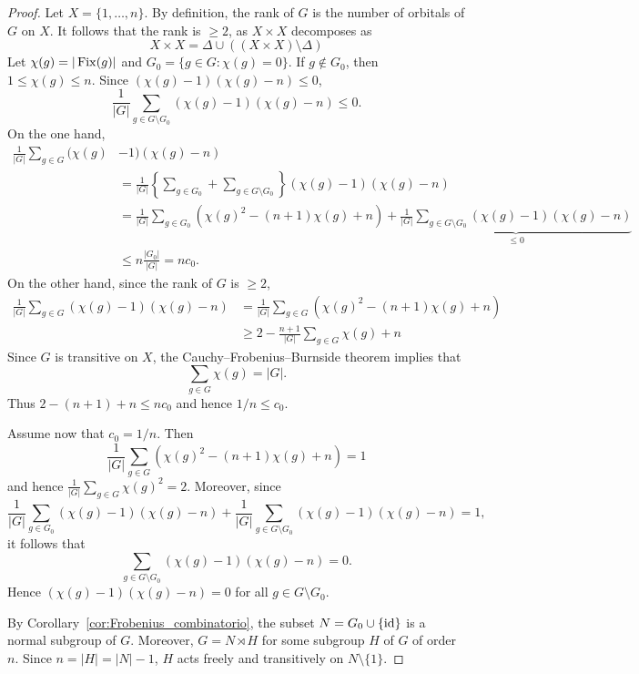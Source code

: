 \begin{proof}
    Let $X=\{1,\dots,n\}$. By definition, the rank of $G$ is the number
    of orbitals of $G$ on $X$. It follows that the rank is $\geq2$, as
    $X\times X$ decomposes as 
    \[
    X\times X=\Delta\cup\left((X\times X)\setminus\Delta\right)
    \]
    Let $\chi(g)=|\operatorname{Fix}(g)|$ and $G_0=\{g\in G:\chi(g)=0\}$. If $g\not\in G_0$, then $1\leq\chi(g)\leq n$. Since  
    $(\chi(g)-1)(\chi(g)-n)\leq 0$,
    \[
    \frac{1}{|G|}\sum_{g\in G\setminus G_0}(\chi(g)-1)(\chi(g)-n)\leq 0.
    \]
    On the one hand, 
    \begin{align*}
    \frac{1}{|G|}\sum_{g\in G}(\chi(g)&-1)(\chi(g)-n)\\
    &=\frac{1}{|G|}\left\{\sum_{g\in G_0}+\sum_{g\in G\setminus G_0}\right\}(\chi(g)-1)(\chi(g)-n)\\
    &=\frac{1}{|G|}\sum_{g\in G_0}(\chi(g)^2-(n+1)\chi(g)+n)
    +\underbrace{\frac{1}{|G|}\sum_{g\in G\setminus G_0}(\chi(g)-1)(\chi(g)-n)}_{\leq0}\\
    &\leq n\frac{|G_0|}{|G|}=nc_0.
    \end{align*}
    On the other hand, since the rank of $G$ is $\geq2$, 
    \begin{align*}
        \frac{1}{|G|}\sum_{g\in G}(\chi(g)-1)(\chi(g)-n)
        &=\frac{1}{|G|}\sum_{g\in G}(\chi(g)^2-(n+1)\chi(g)+n)\\
        &\geq 2-\frac{n+1}{|G|}\sum_{g\in G}\chi(g)+n
    \end{align*}
    Since $G$ is transitive on $X$, the Cauchy--Frobenius--Burnside theorem implies that
    \[
    \sum_{g\in G}\chi(g)=|G|.
    \]
    Thus $2-(n+1)+n\leq nc_0$ and hence
    $1/n\leq c_0$. 

    Assume now that 
    $c_0=1/n$. Then
    \[
    \frac{1}{|G|}\sum_{g\in G}(\chi(g)^2-(n+1)\chi(g)+n)=1
    \]
    and hence $\frac{1}{|G|}\sum_{g\in G}\chi(g)^2=2$. Moreover, 
    since 
    \[
    \frac{1}{|G|}\sum_{g\in G_0}(\chi(g)-1)(\chi(g)-n)
    +\frac{1}{|G|}\sum_{g\in G\setminus G_0}(\chi(g)-1)(\chi(g)-n)=1,
    \]
    it follows that 
    \[
    \sum_{g\in G\setminus G_0}(\chi(g)-1)(\chi(g)-n)=0.
    \]
    Hence $(\chi(g)-1)(\chi(g)-n)=0$
    for all $g\in G\setminus G_0$. 
    
    By Corollary~\ref{cor:Frobenius_combinatorio}, 
    the subset $N=G_0\cup\{\operatorname{id}\}$ is a normal subgroup of $G$. Moreover, $G=N\rtimes H$ for some 
    subgroup $H$ of $G$ of order $n$. Since 
    $n=|H|=|N|-1$, $H$ acts freely and transitively 
    on $N\setminus\{1\}$. 


\end{proof}
